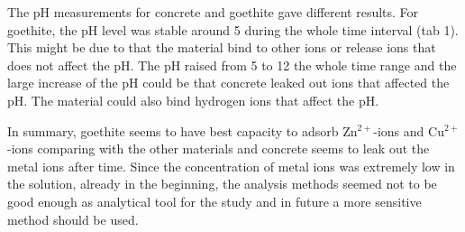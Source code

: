 The pH measurements for concrete and goethite gave different results. For
goethite, the pH level was stable around 5 during the whole time interval (tab 1).
This might be due to that the material bind to other ions or
release ions that does not affect the pH. The pH raised from 5 to 12 the whole
time range and the large increase of the pH could be that concrete leaked out
ions that affected the pH. The material could also bind hydrogen ions that
affect the pH.

In summary, goethite seems to have best capacity to adsorb Zn$^{2+}$-ions and
Cu$^{2+}$-ions comparing with the other materials and concrete seems to leak out the
metal ions after time. Since the concentration of metal ions was extremely low
in the solution, already in the beginning, the analysis methods seemed not to
be good enough as analytical tool for the study and in future a more sensitive
method should be used.

